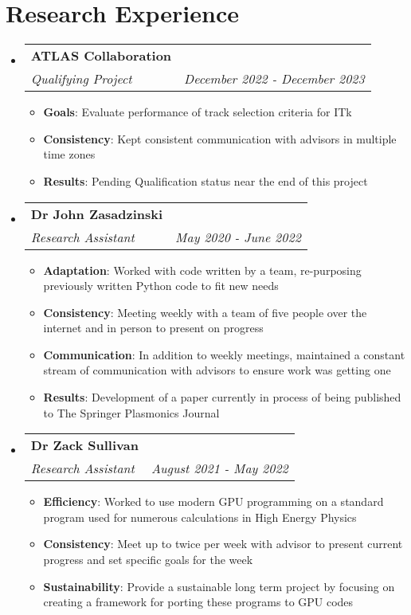 \documentclass[a4paper,20pt]{article}
\makeatletter
\newcommand{\resumeItem}[2]{
  \item\small{
    \textbf{#1}{: #2 \vspace{-2pt}}
  }
}
\newcommand{\resumeSubheading}[4]{
  \vspace{-1pt}\item
    \begin{tabular*}{0.97\textwidth}{l@{\extracolsep{\fill}}r}
      \textbf{#1} & #2 \\
      \textit{#3} & \textit{#4} \\
    \end{tabular*}\vspace{-5pt}
}
\newcommand{\resumeSubHeadingListStart}{\begin{itemize}[leftmargin=*]}
\newcommand{\resumeSubHeadingListEnd}{\end{itemize}}
\newcommand{\resumeItemListStart}{\begin{itemize}}
\newcommand{\resumeItemListEnd}{\end{itemize}\vspace{-5pt}}
\makeatother
\begin{document}
\section{Research Experience}
\resumeSubHeadingListStart
\resumeSubheading{ATLAS Collaboration}{}
{Qualifying Project}{December 2022 - December 2023}
\resumeItemListStart
\resumeItem{Goals}{Evaluate performance of track selection criteria for ITk}
\resumeItem{Consistency}{Kept consistent communication with advisors in multiple time zones}
\resumeItem{Results}{Pending Qualification status near the end of this project}
\resumeItemListEnd
\vspace{-5pt}
\resumeSubheading{Dr John Zasadzinski}{}
{Research Assistant}{May 2020 - June 2022}
\resumeItemListStart
\resumeItem{Adaptation}{Worked with code written by a team, re-purposing previously written Python code to fit new needs}
\resumeItem{Consistency}{Meeting weekly with a team of five people over the internet and in person to present on progress}
\resumeItem{Communication}{In addition to weekly meetings, maintained a constant stream of communication with advisors to ensure work was getting one}
\resumeItem{Results}{Development of a paper currently in process of being published to The Springer Plasmonics Journal}
\resumeItemListEnd
\vspace{-5pt}
\resumeSubheading{Dr Zack Sullivan}{}
{Research Assistant}{August 2021 -  May 2022}
\resumeItemListStart
\resumeItem{Efficiency}{Worked to use modern GPU programming on a standard program used for numerous calculations in High Energy Physics}
\resumeItem{Consistency}{Meet up to twice per week with advisor to present current progress and set specific goals for the week}
\resumeItem{Sustainability}{Provide a sustainable long term project by focusing on creating a framework for porting these programs to GPU codes }
\resumeItemListEnd
\resumeSubHeadingListEnd

\vspace{-5pt}
\end{document}
